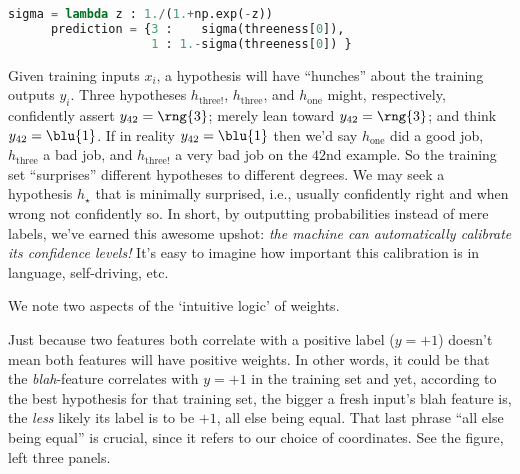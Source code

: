   \begin{lstlisting}[language=Python, basicstyle=\footnotesize\ttfamily]
      sigma = lambda z : 1./(1.+np.exp(-z))
      prediction = {3 :    sigma(threeness[0]),
                    1 : 1.-sigma(threeness[0]) }
  \end{lstlisting}
  Given training inputs $x_i$, a hypothesis will have ``hunches'' about the
  training outputs $y_i$.  Three hypotheses $h_{\text{three!}}$,
  $h_{\text{three}}$, and $h_{\text{one}}$ might, respectively, confidently
  assert $y_{42}={\rng{3}}$; merely lean toward $y_{42}={\rng{3}}$; and think $y_{42}={\blu{1}}$.  If
  in reality $y_{42}={\blu{1}}$ then we'd say $h_{\text{one}}$ did a good job, $h_{\text{three}}$ a bad
  job, and $h_{\text{three!}}$ a very bad job on the $42$nd example.
  So the training set ``surprises'' different hypotheses to different degrees.
  We may seek a hypothesis $h_\star$ that is minimally surprised, i.e., usually
  confidently right and when wrong not confidently so.
  In short, by outputting probabilities instead of mere labels, we've earned
  this awesome upshot: \emph{the machine can automatically calibrate its
  confidence levels!}
    It's easy to imagine how important this calibration is in language, self-driving, etc.




  We note two aspects of the `intuitive logic' of weights.

  Just because two features both correlate with a positive label ($y=+1$)
  doesn't mean both features will have positive weights.  In other words,
  it could be that the \emph{blah}-feature correlates with $y=+1$ in the
  training set and yet, according to the best hypothesis for that
  training set, the bigger a fresh input's blah feature is, the
  \emph{less} likely its label is to be $+1$, all else being equal.  That
  last phrase ``all else being equal'' is crucial, since it refers to our
  choice of coordinates.
  See the figure, left
  three panels.

